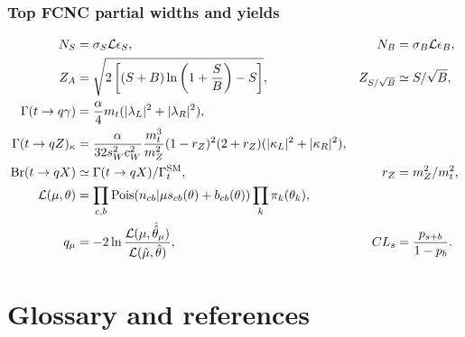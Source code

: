 \documentclass[11pt,a4paper]{report}
\newcommand{\br}{\mathrm{Br}}
\begin{document}
\section{Top FCNC partial widths and yields}
\begin{align}
N_S&=\sigma_S\mathcal L\epsilon_S, & N_B&=\sigma_B\mathcal L\epsilon_B,\\
Z_A&=\sqrt{2\left[(S+B)\ln\left(1+\frac{S}{B}\right)-S\right]}, & Z_{S/\sqrt B}&\simeq S/\sqrt B,\\
\Gamma(t\to q\gamma)&=\frac{\alpha}{4}m_t(|\lambda_L|^2+|\lambda_R|^2),\\
\Gamma(t\to qZ)_\kappa&=\frac{\alpha}{32s_W^2c_W^2}\frac{m_t^3}{m_Z^2}(1-r_Z)^2(2+r_Z)(|\kappa_L|^2+|\kappa_R|^2),\\
\br(t\to qX)&\simeq\Gamma(t\to qX)/\Gamma_t^{\rm SM}, & r_Z&=m_Z^2/m_t^2,\\
\mathcal L(\mu,\theta)&=\prod_{c,b}{\rm Pois}(n_{cb}|\mu s_{cb}(\theta)+b_{cb}(\theta))\prod_k\pi_k(\theta_k),\\
q_\mu&=-2\ln\frac{\mathcal L(\mu,\hat{\hat\theta}_\mu)}{\mathcal L(\hat\mu,\hat\theta)}, & CL_s&=\frac{p_{s+b}}{1-p_b}.
\end{align}

\part{Glossary and references}
\end{document}
